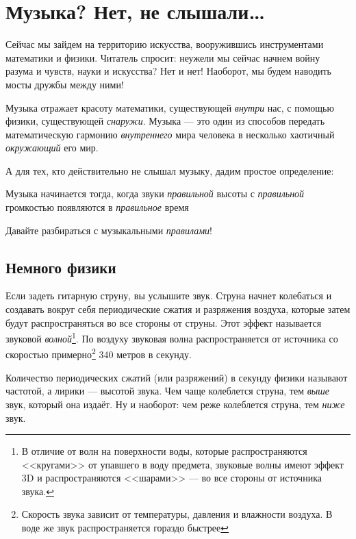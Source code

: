 \chapter{Музыка? Нет, не слышали\ldots}
\label{ch:music}

Сейчас мы зайдем на территорию искусства, вооружившись инструментами математики и физики. Читатель спросит: неужели мы сейчас начнем войну разума и чувств, науки и искусства? Нет и нет! Наоборот, мы будем наводить мосты дружбы между ними! 

Музыка отражает красоту математики, существующей \emph{внутри} нас, с помощью физики, существующей \emph{снаружи}. Музыка --- это один из способов передать математическую гармонию \emph{внутреннего} мира человека в несколько хаотичный \emph{окружающий} его мир.

А для тех, кто действительно не слышал музыку, дадим простое определение:

\begin{Definition}[Музыка]
    Музыка начинается тогда, когда звуки \emph{правильной} высоты с \emph{правильной} громкостью появляются в \emph{правильное} время
\end{Definition}

Давайте разбираться с музыкальными \emph{правилами}!


\section{Немного физики}
\label{ch:music:physics}

Если задеть гитарную струну, вы услышите звук. Струна начнет колебаться и создавать вокруг себя периодические сжатия и разряжения воздуха, которые затем будут распространяться во все стороны от струны. Этот эффект называется звуковой \emph{волной}\footnote{В отличие от волн на поверхности воды, которые распространяются <<кругами>> от упавшего в воду предмета, звуковые волны имеют эффект 3D и распространяются <<шарами>> --- во все стороны от источника звука.}. По воздуху звуковая волна распространяется от источника со скоростью примерно\footnote{Скорость звука зависит от температуры, давления и влажности воздуха. В воде же звук распространяется гораздо быстрее} 340 метров в секунду.

Количество периодических сжатий (или разряжений) в секунду физики называют частотой, а лирики --- высотой звука. Чем чаще колеблется струна, тем \emph{выше} звук, который она издаёт. Ну и наоборот: чем реже колеблется струна, тем \emph{ниже} звук.

